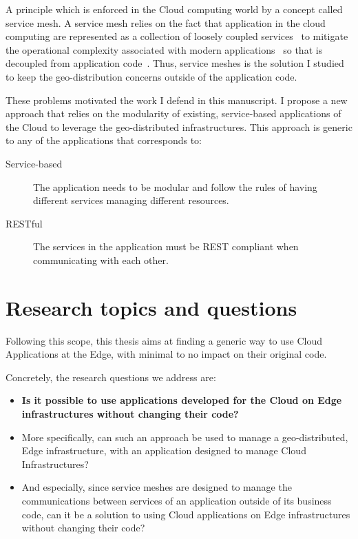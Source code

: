 A principle which is enforced in the Cloud computing world by a
concept called service mesh.
%
A service mesh relies on the fact that application in the cloud
computing are represented as a collection of \gls{loosely coupled}
\glspl{service}~\cite{GZCS+19} to mitigate the operational complexity
associated with modern applications~\cite{LLGZG19} so that is
decoupled from application code~\cite{SMmanifesto}.
%
Thus, service meshes is the solution I studied to keep
the geo-distribution concerns outside of the application code.

These problems motivated the work I defend in this manuscript.
%
I propose a new approach that relies on the modularity of
existing, service-based applications of the Cloud to leverage the
geo-distributed infrastructures.
%
This approach is generic to any of the applications that corresponds to:
\begin{description}
\item[Service-based] The application needs to be modular and follow
  the rules of having different \glspl{service} managing different resources.
\item[RESTful] The services in the application must be REST compliant
  when communicating with each other.
\end{description}




\section*{Research topics and questions}

Following this scope, this thesis aims at finding a generic way to use
Cloud Applications at the Edge, with minimal to no impact on their
original code.

%
Concretely, the research questions we address are:
\begin{itemize}
\item[\cloud] \textbf{Is it possible to use applications developed for
    the Cloud on Edge infrastructures without changing their code?}
\item[\cloud] More specifically, can such an approach be used to
  manage a geo-distributed, Edge infrastructure, with an application
  designed to manage Cloud Infrastructures?
%
\item[\cloud] And especially, since service meshes are designed to
  manage the communications between \glspl{service} of an application
  outside of its business code, can it be a solution to using Cloud
  applications on Edge infrastructures without changing their code?
\end{itemize}



